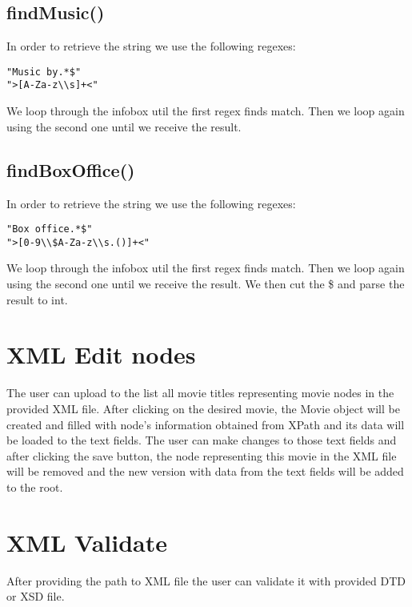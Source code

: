 \documentclass[a4paper,12pt]{article}
\begin{document}
\subsection{findMusic()}
In order to retrieve the string we use the following regexes:
\begin{lstlisting}
"Music by.*$"
">[A-Za-z\\s]+<"
\end{lstlisting}
We loop through the infobox util the first regex finds match. Then we loop again using the second one until we receive the result.

\subsection{findBoxOffice()}
In order to retrieve the string we use the following regexes:
\begin{lstlisting}
"Box office.*$"
">[0-9\\$A-Za-z\\s.()]+<"
\end{lstlisting}
We loop through the infobox util the first regex finds match. Then we loop again using the second one until we receive the result. We then cut the \$ and parse the result to int.

\section{XML Edit nodes}
The user can upload to the list all movie titles representing movie nodes in the provided XML file. After clicking on the desired movie, the Movie object will be created and filled with node's information obtained from XPath and its data will be loaded to the text fields. The user can make changes to those text fields and after clicking the save button, the node representing this movie in the XML file will be removed and the new version with data from the text fields will be added to the root.

\section{XML Validate}
After providing the path to XML file the user can validate it with provided DTD or XSD file.
\end{document}
